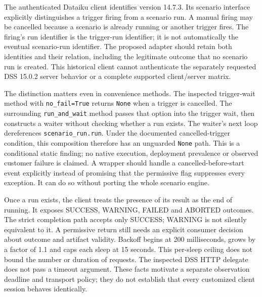 The authenticated Dataiku client identifies version 14.7.3. Its scenario
interface explicitly distinguishes a trigger firing from a scenario run.
A manual firing may be cancelled because a scenario is already running or
another trigger fires. The firing's run identifier is the trigger-run
identifier; it is not automatically the eventual scenario-run identifier.
The proposed adapter should retain both identities and their relation,
including the legitimate outcome that no scenario run is created. This
historical client cannot authenticate the separately requested DSS 15.0.2
server behavior or a complete supported client/server matrix.
\citep{exec24_workflow_contracts_dataiku}

The distinction matters even in convenience methods. The inspected
trigger-wait method with \texttt{no\_fail=True} returns \texttt{None}
when a trigger is cancelled. The surrounding \texttt{run\_and\_wait}
method passes that option into the trigger wait, then constructs a waiter
without checking whether a run exists. The waiter's next loop dereferences
\texttt{scenario\_run.run}. Under the documented cancelled-trigger
condition, this composition therefore has an unguarded \texttt{None} path.
This is a conditional static finding; no native execution, deployment
prevalence or observed customer failure is claimed. A wrapper should handle
a cancelled-before-start event explicitly instead of promising that the
permissive flag suppresses every exception. It can do so without porting
the whole scenario engine.~\citep{exec24_workflow_contracts_dataiku}

Once a run exists, the client treats the presence of its result as the end
of running. It exposes SUCCESS, WARNING, FAILED and ABORTED outcomes.
The strict completion path accepts only SUCCESS; WARNING is not silently
equivalent to it. A permissive return still needs an explicit consumer
decision about outcome and artifact validity. Backoff begins at 200
milliseconds, grows by a factor of 1.1 and caps each sleep at 15 seconds.
This per-sleep ceiling does not bound the number or duration of requests.
The inspected DSS HTTP delegate does not pass a timeout argument. These
facts motivate a separate observation deadline and transport policy; they
do not establish that every customized client session behaves identically.
\citep{exec24_workflow_contracts_dataiku}

